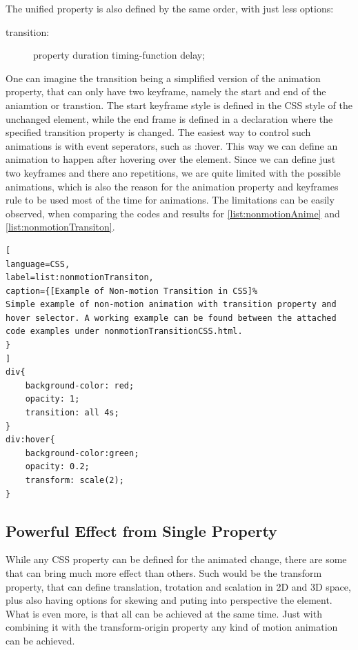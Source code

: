 The unified property is also defined by the same order, with just less options:

\begin{description}
\item [transition:] property duration timing-function delay;
\end{description}

One can imagine the transition being a simplified version of the animation property, that can only have two keyframe, namely the start and end of the aniamtion or transtion. The start keyframe style is defined in the CSS style of the unchanged element, while the end frame is defined in a declaration where the specified transition property is changed. The easiest way to control such animations is with event seperators, such as :hover. This way we can define an animation to happen after hovering over the element. Since we can define just two keyframes and there ano repetitions, we are quite limited with the possible animations, which is also the reason for the animation property and keyframes rule to be used most of the time for animations. The limitations can be easily observed, when comparing the codes and results for \ref{list:nonmotionAnime} and \ref{list:nonmotionTransiton}.

\begin{lstlisting}[
language=CSS,
label=list:nonmotionTransiton,
caption={[Example of Non-motion Transition in CSS]%
Simple example of non-motion animation with transition property and hover selector. A working example can be found between the attached code examples under nonmotionTransitionCSS.html.
}
]
div{
	background-color: red;
	opacity: 1;
	transition: all 4s;
}
div:hover{
	background-color:green;
	opacity: 0.2;
	transform: scale(2);
}
\end{lstlisting}



\subsection{Powerful Effect from Single Property} %
\label{sub:transformCSS}

While any CSS property can be defined for the animated change, there are some that can bring much more effect than others. Such would be the transform property, that can define translation, trotation and scalation in 2D and 3D space, plus also having options for skewing and puting into perspective the element. What is even more, is that all can be achieved at the same time. Just with combining it with the transform-origin property any kind of motion animation can be achieved.

